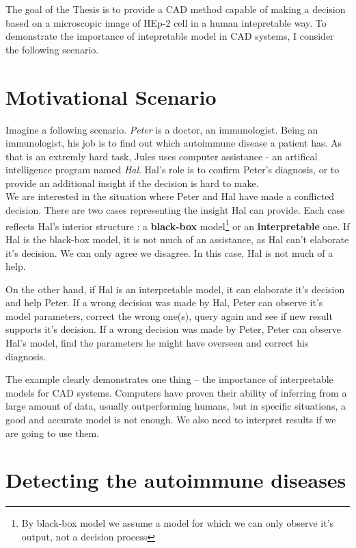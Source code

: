 The goal of the Thesis is to provide a  CAD method capable of making a decision based on a microscopic image of HEp-2 cell in a human intepretable way. To demonstrate the importance of intepretable model in CAD systems, I consider the following scenario.


\section{Motivational Scenario}

Imagine a following scenario. \textit{Peter} is a doctor, an immunologist. Being an immunologist, his job is to find out which autoimmune disease a patient has. As that is an extremly hard task, Jules uses  computer assistance - an artifical intelligence program named \textit{Hal}. Hal's role is to confirm Peter's diagnosis, or to provide an additional insight if the decision is hard to make. \\

We are interested in the situation where Peter and Hal have made a conflicted decision. There are two cases representing the insight Hal can provide. Each case reflects Hal's interior structure : a \textbf{black-box} model\footnote{By black-box model we assume a model for which we can only observe it's output, not a decision process} or an \textbf{ interpretable} one. If Hal is the black-box model, it is not much of an assistance, as Hal can't elaborate it's decision. We can only agree we disagree. In this case, Hal is not much of a help. 

On the other hand, if Hal is an interpretable model, it can elaborate it's decision and help Peter. If a wrong decision was made by Hal, Peter can observe it's model parameters, correct the wrong one(s), query again and see if new result supports it's decision. If a wrong decision was made by Peter, Peter can observe Hal's model, find the parameters he might have overseen and correct his diagnosis. 

The example clearly demonstrates one  thing -- the importance of interpretable models for CAD systems. Computers have proven their ability of inferring from a large amount of data, usually outperforming humans, but in specific situations, a good and accurate model is not enough. We also need to interpret results if we are going to use them.

\section{Detecting the autoimmune diseases}


